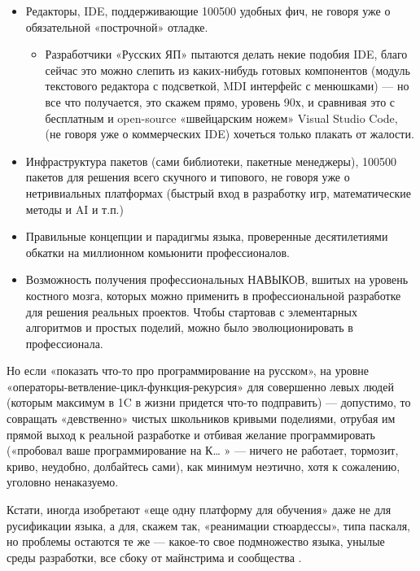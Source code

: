 ﻿\documentclass[a4paper,12pt]{article}
\providecommand{\tightlist}{%
     \setlength{\itemsep}{0pt}\setlength{\parskip}{0pt}}
\begin{document}
\begin{itemize}
\tightlist
\item
  Редакторы, IDE, поддерживающие 100500 удобных фич, не говоря уже о
  обязательной «построчной» отладке.

  \begin{itemize}
  \tightlist
  \item
    Разработчики «Русских ЯП» пытаются делать некие подобия IDE, благо
    сейчас это можно слепить из каких-нибудь готовых компонентов (модуль
    текстового редактора с подсветкой, MDI интерфейс с менюшками) --- но
    все что получается, это скажем прямо, уровень 90х, и сравнивая это с
    бесплатным и open-source «швейцарским ножем» Visual Studio Code, (не
    говоря уже о коммерческих IDE) хочеться только плакать от жалости.
  \end{itemize}
\item
  Инфраструктура пакетов (сами библиотеки, пакетные менеджеры), 100500
  пакетов для решения всего скучного и типового, не говоря уже о
  нетривиальных платформах (быстрый вход в разработку игр,
  математические методы и AI и т.п.)
\item
  Правильные концепции и парадигмы языка, проверенные десятилетиями
  обкатки на миллионном комьюнити профессионалов.
\item
  Возможность получения профессиональных НАВЫКОВ, вшитых на уровень
  костного мозга, которых можно применить в профессиональной разработке
  для решения реальных проектов. Чтобы стартовав с элементарных
  алгоритмов и простых поделий, можно было эволюционировать в
  профессионала.
\end{itemize}

Но если «показать что-то про программирование на русском», на уровне
«операторы-ветвление-цикл-функция-рекурсия» для совершенно левых людей
(которым максимум в 1C в жизни придется что-то подправить) ---
допустимо, то совращать «девственно» чистых школьников кривыми
поделиями, отрубая им прямой выход к реальной разработке и отбивая
желание программировать («пробовал ваше программирование на К\ldots{} »
--- ничего не работает, тормозит, криво, неудобно, долбайтесь сами), как
минимум неэтично, хотя к сожалению, уголовно ненаказуемо.

Кстати, иногда изобретают «еще одну платформу для обучения» даже не для
русификации языка, а для, скажем так, «реанимации стюардессы», типа
паскаля, но проблемы остаются те
же --- какое-то свое подмножество языка, унылые среды разработки, все
сбоку от майнстрима и сообщества \cite{pascal-sucks}.
\end{document}
